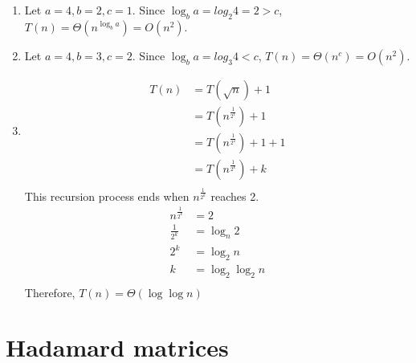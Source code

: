 \documentclass[11pt]{article}
\begin{document}
\renewcommand{\labelenumi}{(\alph{enumi})}
\begin{enumerate}
	\item 
	Let $a=4, b=2, c=1$. Since $\log_ba = log_2 4 = 2 > c$, $T(n) = \Theta(n^{\log_ba}) = O(n^2)$.
	\item 
	Let $a=4, b=3, c=2$. Since $\log_ba = log_3 4 < c$, $T(n) = \Theta(n^c) = O(n^2)$.
	\item
	\begin{align*}
		T(n) &= T(\sqrt{n}) + 1 \\
			&= T(n^\frac{1}{2^1}) + 1 \\
			&= T(n^\frac{1}{2^2}) + 1 + 1 \\
			&= T(n^\frac{1}{2^k}) + k \\
	\end{align*}
	This recursion process ends when $n^\frac{1}{2^k}$ reaches 2.
	\begin{align*}
		n^\frac{1}{2^k} &= 2 \\
		\frac{1}{2^k} &= \log_n2  \\
		2^k &= \log_2n \\
		k &= \log_2 \log_2n  \\
	\end{align*}
	Therefore, $T(n) = \Theta(\log \log n)$
\end{enumerate}


  \newpage
  \section{Hadamard matrices}
  
\end{document}
